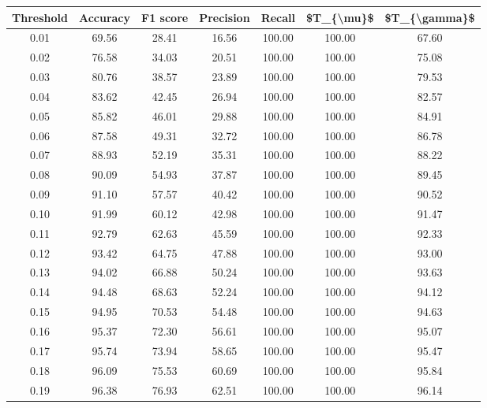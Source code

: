 \begin{tabular}{|c|c|c|c|c|c|c|}
\hline
 Threshold &  Accuracy &  F1 score &  Precision &  Recall &  \$T\_\{\textbackslash mu\}\$ &  \$T\_\{\textbackslash gamma\}\$ \\
\hline
      0.01 &     69.56 &     28.41 &      16.56 &  100.00 &     100.00 &         67.60 \\
      0.02 &     76.58 &     34.03 &      20.51 &  100.00 &     100.00 &         75.08 \\
      0.03 &     80.76 &     38.57 &      23.89 &  100.00 &     100.00 &         79.53 \\
      0.04 &     83.62 &     42.45 &      26.94 &  100.00 &     100.00 &         82.57 \\
      0.05 &     85.82 &     46.01 &      29.88 &  100.00 &     100.00 &         84.91 \\
      0.06 &     87.58 &     49.31 &      32.72 &  100.00 &     100.00 &         86.78 \\
      0.07 &     88.93 &     52.19 &      35.31 &  100.00 &     100.00 &         88.22 \\
      0.08 &     90.09 &     54.93 &      37.87 &  100.00 &     100.00 &         89.45 \\
      0.09 &     91.10 &     57.57 &      40.42 &  100.00 &     100.00 &         90.52 \\
      0.10 &     91.99 &     60.12 &      42.98 &  100.00 &     100.00 &         91.47 \\
      0.11 &     92.79 &     62.63 &      45.59 &  100.00 &     100.00 &         92.33 \\
      0.12 &     93.42 &     64.75 &      47.88 &  100.00 &     100.00 &         93.00 \\
      0.13 &     94.02 &     66.88 &      50.24 &  100.00 &     100.00 &         93.63 \\
      0.14 &     94.48 &     68.63 &      52.24 &  100.00 &     100.00 &         94.12 \\
      0.15 &     94.95 &     70.53 &      54.48 &  100.00 &     100.00 &         94.63 \\
      0.16 &     95.37 &     72.30 &      56.61 &  100.00 &     100.00 &         95.07 \\
      0.17 &     95.74 &     73.94 &      58.65 &  100.00 &     100.00 &         95.47 \\
      0.18 &     96.09 &     75.53 &      60.69 &  100.00 &     100.00 &         95.84 \\
      0.19 &     96.38 &     76.93 &      62.51 &  100.00 &     100.00 &         96.14 \\

\end{tabular}
